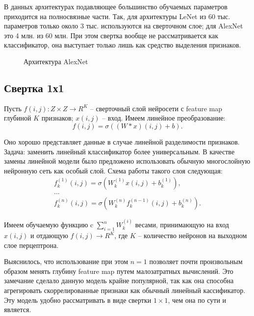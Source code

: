 \documentclass[12pt, specialist, subf, substylefile = spbu.rtx]{disser}
\begin{document}
В данных архитектурах подавляющее большинство обучаемых параметров приходится на полносвязные части. Так, для архитектуры LeNet из 60 тыс. параметров только около 3 тыс. используются на сверточном слое; для AlexNet это 4 млн. из 60 млн. При этом свертка вообще не рассматривается как классификатор, она выступает только лишь как средство выделения признаков.

\begin{figure}[h]
\caption{Архитектура AlexNet}
\label{img:alexnet}
\end{figure}

\subsection{Свертка 1х1}

Пусть $f(i,j) : Z \times Z \to R^K$ -- сверточный слой нейросети с feature map глубиной $K$ признаков; $x(i, j)$ -- вход. Имеем линейное преобразование:
$$
f(i,j)=\sigma((W*x)(i,j) + b).
$$

Оно хорошо представляет данные в случае линейной разделимости признаков. Задача: заменить линейный классификатор более универсальным. В качестве замены линейной модели было предложено использовать обычную многослойную нейронную сеть как особый слой. Схема работы такого слоя следующая:
\begin{gather*}
f_k^{(1)}(i,j)=\sigma(W_k^{(1)} x(i,j) + b_k^{(1)}), \\
... \\
f_k^{(n)}(i,j)=\sigma(W_k^{(n)} f_k^{(n-1)}(i,j) + b_k^{(n)}).
\end{gather*}

Имеем обучаемую функцию c $\sum_{i=1}^n W_k^{(i)}$ весами, принимающую на вход $x(i, j)$ и отдающую $f(i, j) \to R^K$, где $K$ -- количество нейронов на выходном слое перцептрона. 

Выяснилось, что использование при этом $n=1$ позволяет почти произвольным образом менять глубину feature map путем малозатратных вычислений. Это замечание сделало данную модель крайне популярной, так как она способна агрегировать скоррелированные признаки как обычный линейный кассификатор. Эту модель удобно рассматривать в виде свертки $1 \times 1$, чем она по сути и является.
\end{document}
